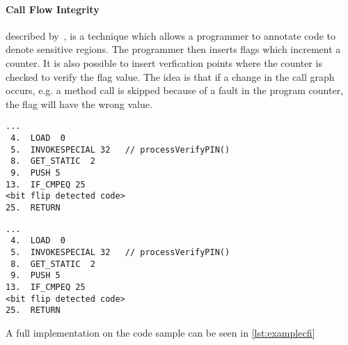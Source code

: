 \paragraph{Call Flow Integrity} described by~\cite{agl}, is a technique which allows a programmer to annotate code to denote sensitive regions. The programmer then inserts flags which increment a counter. It is also possible to insert verfication points where the counter is checked to verify the flag value. The idea is that if a change in the call graph occurs, e.g. a method call is skipped because of a fault in the program counter, the flag will have the wrong value. 

\begin{lstlisting}[caption={Java code example of the control flow integrity countermeasure checking the control flow flag},label={lst:examplecfisnip}]
...
 4.  LOAD  0
 5.  INVOKESPECIAL 32   // processVerifyPIN()
 8.  GET_STATIC  2
 9.  PUSH 5
13.  IF_CMPEQ 25
<bit flip detected code>
25.  RETURN
\end{lstlisting}

\begin{lstlisting}[caption={Java code example of the control flow integrity countermeasure checking the control flow flag},label={lst:examplecfisnip}]
...
 4.  LOAD  0
 5.  INVOKESPECIAL 32   // processVerifyPIN()
 8.  GET_STATIC  2
 9.  PUSH 5
13.  IF_CMPEQ 25
<bit flip detected code>
25.  RETURN
\end{lstlisting}

A full implementation on the code sample can be seen in \cref{lst:examplecfi}
